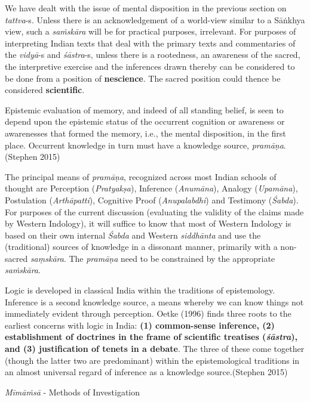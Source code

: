 We have dealt with the issue of mental disposition in the previous section on {\sl tattva}-s. Unless there is an acknowledgement of a world-view similar to a Sāṅkhya view, such a {\sl saṁskāra} will be for practical purposes, irrelevant. For purposes of interpreting Indian texts that deal with the primary texts and commentaries of the {\sl vidyā}-s and {\sl śāstra}-s, unless there is a rootedness, an awareness of the sacred, the interpretive exercise and the inferences drawn thereby can be considered to be done from a position of {\bf nescience}. The sacred position could thence be considered {\bf scientific}.
\begin{myquote}
Epistemic evaluation of memory, and indeed of all standing belief, is seen to depend upon the epistemic status of the occurrent cognition or awareness or awarenesses that formed the memory, i.e., the mental disposition, in the first place. Occurrent knowledge in turn must have a knowledge source, {\sl pramāṇa}.\hfill (Stephen 2015)
\end{myquote}

The principal means of {\sl pramāṇa}, recognized across most Indian schools of thought are Perception ({\sl Pratyakṣa}), Inference ({\sl Anumāna}), Analogy ({\sl Upamāna}), Postulation ({\sl Arthāpatti}), Cognitive Proof ({\sl Anupalabdhi}) and Testimony ({\sl Śabda}). For purposes of the current discussion (evaluating the validity of the claims made by Western Indology), it will suffice to know that most of Western Indology is based on their own internal {\sl Śabda} and Western {\sl siddhānta} and use the (traditional) sources of knowledge in a dissonant manner,  primarily with a non-sacred {\sl saṃskāra}. The {\sl pramāṇa} need to be constrained by the appropriate {\sl saṁskāra}.
\begin{myquote}
Logic is developed in classical India within the traditions of epistemology. Inference is a second knowledge source, a means whereby we can know things not immediately evident through perception. Oetke (1996) finds three roots to the earliest concerns with logic in India: {\bf (1) common-sense inference, (2) establishment of doctrines in the frame of scientific treatises ({{\sl\bfseries śāstra}\relax}), and (3) justification of tenets in a debate}. The three of these come together (though the latter two are predominant) within the epistemological traditions in an almost universal regard of inference as a knowledge source.\hfill (Stephen 2015)
\end{myquote}

{\sl Mīmāṁsā} - Methods of Investigation

